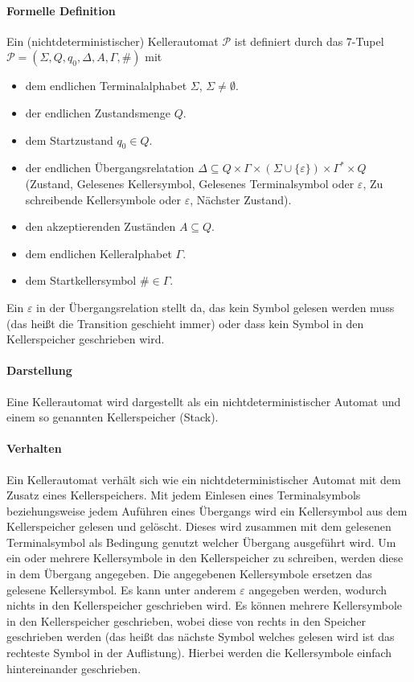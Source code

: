         \paragraph{Formelle Definition}
            Ein (nichtdeterministischer) Kellerautomat $ \mathcal{P} $ ist definiert durch das 7-Tupel $ \mathcal{P} = (\Sigma, Q, q _ 0, \Delta, A, \Gamma, \#) $ mit
            \begin{itemize}
                \item dem endlichen Terminalalphabet $ \Sigma $, $ \Sigma \neq \emptyset $.
                \item der endlichen Zustandsmenge $ Q $.
                \item dem Startzustand $ q _ 0 \in Q $.
                \item der endlichen Übergangsrelatation $ \Delta \subseteq Q \times \Gamma \times (\Sigma \cup \{ \varepsilon \}) \times \Gamma ^ * \times Q $ (Zustand, Gelesenes Kellersymbol, Gelesenes Terminalsymbol oder $ \varepsilon $, Zu schreibende Kellersymbole oder $ \varepsilon $, Nächster Zustand).
                \item den akzeptierenden Zuständen $ A \subseteq Q $.
                \item dem endlichen Kelleralphabet $ \Gamma $.
                \item dem Startkellersymbol $ \# \in \Gamma $.
            \end{itemize}
            Ein $ \varepsilon $ in der Übergangsrelation stellt da, das kein Symbol gelesen werden muss (das heißt die Transition geschieht immer) oder dass kein Symbol in den Kellerspeicher geschrieben wird.

        \paragraph{Darstellung}
            Eine Kellerautomat wird dargestellt als ein nichtdeterministischer Automat und einem so genannten Kellerspeicher (Stack).

        \paragraph{Verhalten}
            Ein Kellerautomat verhält sich wie ein nichtdeterministischer Automat mit dem Zusatz eines Kellerspeichers. Mit jedem Einlesen eines Terminalsymbols beziehungsweise jedem Auführen eines Übergangs wird ein Kellersymbol aus dem Kellerspeicher gelesen und gelöscht. Dieses wird zusammen mit dem gelesenen Terminalsymbol als Bedingung genutzt welcher Übergang ausgeführt wird. Um ein oder mehrere Kellersymbole in den Kellerspeicher zu schreiben, werden diese in dem Übergang angegeben. Die angegebenen Kellersymbole ersetzen das gelesene Kellersymbol. Es kann unter anderem $ \varepsilon $ angegeben werden, wodurch nichts in den Kellerspeicher geschrieben wird. Es können mehrere Kellersymbole in den Kellerspeicher geschrieben, wobei diese von rechts in den Speicher geschrieben werden (das heißt das nächste Symbol welches gelesen wird ist das rechteste Symbol in der Auflistung). Hierbei werden die Kellersymbole einfach hintereinander geschrieben.

